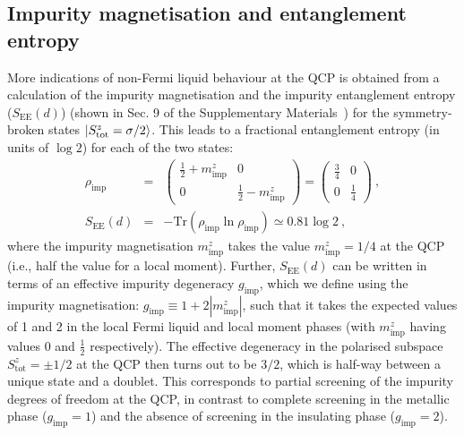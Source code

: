 \documentclass{iopart}
\begin{document}
\subsection{Impurity magnetisation and entanglement entropy}
More indications of non-Fermi liquid behaviour at the QCP is obtained from a calculation of the impurity magnetisation and the impurity entanglement entropy (\(S_\text{EE}(d)\)) (shown in Sec. 9 of the Supplementary Materials~\cite{supp_mat}) for the symmetry-broken states \(\ket{S_\text{tot}^z = \sigma/2}\). This 
leads to a fractional entanglement entropy (in units of \(\log 2\)) for each of the two states:
\begin{eqnarray}
	\rho_\text{imp} &=& \begin{pmatrix} \frac{1}{2} + m_\text{imp}^z & 0 \\ 0 & \frac{1}{2} - m_\text{imp}^z \end{pmatrix} = \begin{pmatrix} \frac{3}{4} & 0 \\ 0 & \frac{1}{4} \end{pmatrix}~,\nonumber\\ 
	S_\text{EE}(d) &=& -\text{Tr}\left(\rho_\text{imp} \ln \rho_\text{imp}\right) \simeq 0.81 \log 2~,
\end{eqnarray}
where the impurity magnetisation \(m_\text{imp}^z\) takes the value \(m_\text{imp}^z = 1/4\) at the QCP (i.e., half the value for a local moment).
Further, \(S_\text{EE}(d)\) can be written in terms of an effective impurity degeneracy \(g_\text{imp}\), which we define using the impurity magnetisation: \(g_\text{imp} \equiv 1 + 2|m_\text{imp}^z|\), such that it takes the expected values of 1 and 2 in the local Fermi liquid and local moment phases (with \(m_\text{imp}^z\) having values 0 and \(\frac{1}{2}\) respectively). The effective degeneracy in the polarised subspace \(S_\text{tot}^z = \pm 1/2\) at the QCP then turns out to be \(3/2\), which is half-way between a unique state and a doublet. This corresponds to partial screening of the impurity degrees of freedom at the QCP, in contrast to complete screening in the metallic phase (\(g_\text{imp} = 1\)) and the absence of screening in the insulating phase (\(g_\text{imp} = 2\)).
\end{document}
